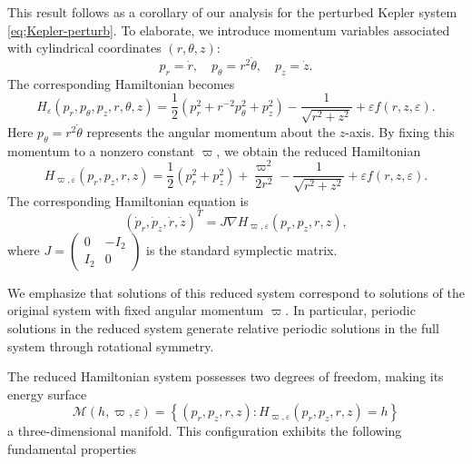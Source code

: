 \documentclass[11pt]{amsart}
\newcommand{\ep}{\varepsilon}
\newcommand{\om}{\varpi}
\begin{document}
This result follows as a corollary of our analysis for the perturbed Kepler system \eqref{eq;Kepler-perturb}. To elaborate, we introduce momentum variables associated with cylindrical coordinates $(r, \theta, z)$:
\begin{equation*}
	p_r = \dot{r}, \quad p_{\theta} = r^2 \dot{\theta}, \quad p_z = \dot{z}.
\end{equation*}
The corresponding Hamiltonian becomes
\begin{equation}
	\label{eq;Ham} 
	H_{\varepsilon}(p_r, p_{\theta}, p_z, r, \theta, z) = \frac{1}{2}\left( p_{r}^2 + r^{-2} p_{\theta}^2 + p_z^2 \right) - \frac{1}{\sqrt{r^2 + z^2}} + \varepsilon f(r, z, \varepsilon).
\end{equation}
Here $p_{\theta} = r^2\dot{\theta}$ represents the angular momentum about the $z$-axis. By fixing this momentum to a nonzero constant $\om$, we obtain the reduced Hamiltonian
\begin{equation}
	\label{eq:spacial kepler pertur Ham}
	H_{\om, \varepsilon}(p_{r},p_{z},r,z) = \frac{1}{2}(p_{r}^{2} + p_{z}^{2}) + \frac{\om^{2}}{2r^{2}} - \frac{1}{\sqrt{r^{2} + z^{2}}} + \varepsilon f(r,z,\varepsilon).
\end{equation}
The corresponding Hamiltonian equation is 
\begin{equation}
	\label{eq;Ham-sys-pert} (\dot{p}_r, \dot{p}_z, \dot{r}, \dot{z})^T = J \nabla H_{\om, \ep}(p_r, p_z, r, z),
\end{equation} where $J=\begin{pmatrix}
0 & -I_2\\
I_2 & 0
\end{pmatrix}$ is the standard symplectic matrix.

We emphasize that solutions of this reduced system correspond to solutions of the original system with fixed angular momentum $\om$. In particular, periodic solutions in the reduced system generate relative periodic solutions in the full system through rotational symmetry.

The reduced Hamiltonian system possesses two degrees of freedom, making its energy surface
\begin{equation*}
	\mathcal{M}(h, \om, \ep) = \left\{ (p_r, p_z, r, z): H_{\om, \ep} (p_r, p_z, r, z) = h \right\}
\end{equation*}
a three-dimensional manifold. This configuration exhibits the following fundamental properties 
\end{document}
